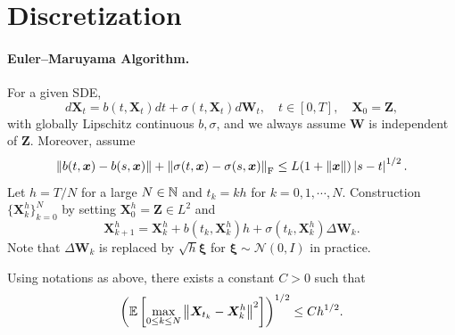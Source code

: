 \section{Discretization}

\paragraph{Euler–Maruyama Algorithm.} For a given SDE,
\begin{equation*}
    d\bm{X}_t = b(t,\bm{X}_t)dt+\sigma(t,\bm{X}_t)d\bm{W}_t, \quad t \in [0,T],\quad \bm{X}_0 = \bm{Z},
\end{equation*}
with globally Lipschitz continuous $b,\sigma$, and we always assume $\bm{W}$ is independent of $\bm{Z}$. Moreover, assume
\begin{equation*}
    \left\lVert b(t,\bm{x}) - b(s,\bm{x})\right\lVert + \left\lVert\sigma(t,\bm{x}) - \sigma(s,\bm{x})\right\lVert_{\operatorname{F}} \leq L(1 + \left\lVert\bm{x}\right\lVert)\left\lvert s - t\right\lvert^{1/2}.
\end{equation*}
Let $h = T/N$ for a large $N \in \mathbb{N}$ and $t_k = kh$ for $k = 0,1,\cdots,N$. Construction $\{\bm{X}^h_k\}_{k=0}^N$ by setting $\bm{X}^h_0 = \bm{Z} \in L^2$ and
\begin{equation*}
    \bm{X}^h_{k+1} = \bm{X}^h_k + b(t_k,\bm{X}^h_k)h + \sigma(t_k,\bm{X}^h_k)\Delta \bm{W}_k.
\end{equation*}
Note that $\Delta \bm{W}_k$ is replaced by $\sqrt{h}\bm{\xi}$ for $\bm{\xi} \sim \mathcal{N}(0,I)$ in practice.
\begin{thm}
    Using notations as above, there exists a constant $C>0$ such that
    \begin{equation*}
        \left(\mathbb{E}\left[\max_{0\leq k \leq N}\left\lVert\bm{X}_{t_k} - \bm{X}^h_k\right\lVert^2\right]\right)^{1/2} \leq Ch^{1/2}.
    \end{equation*}
\end{thm}
